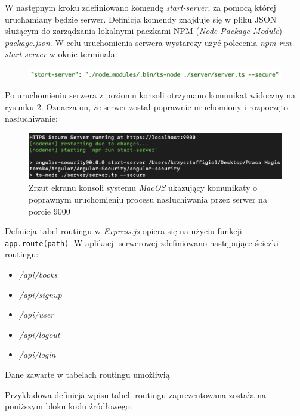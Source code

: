 W następnym kroku zdefiniowano komendę \textit{start-server}, za pomocą której uruchamiany będzie serwer. Definicja komendy znajduje się w pliku JSON służącym do zarządzania lokalnymi paczkami NPM (\textit{Node Package Module}) - \textit{package.json}. W celu uruchomienia serwera wystarczy użyć polecenia \textit{npm run start-server} w oknie terminala. 

\begin{figure}[h]
	\includegraphics[scale=0.7]{images/code/start_server.png}
	\label{Rys:nodejs}
\end{figure}

Po uruchomieniu serwera z poziomu konsoli otrzymano komunikat widoczny na rysunku \ref{Rys:nodejs-running}. Oznacza on, że serwer został poprawnie uruchomiony i rozpoczęto nasłuchiwanie:

\begin{figure}[h]
	\centering\includegraphics[scale=0.76]{images/nodejs/server-running.png}
	\caption{Zrzut ekranu konsoli systemu \textit{MacOS} ukazujący komunikaty o poprawnym uruchomieniu procesu nasłuchiwania przez serwer na porcie 9000}
	\label{Rys:nodejs-running}
\end{figure}

Definicja tabel routingu w \textit{Express.js} opiera się na użyciu funkcji \texttt{app.route(path)}. W aplikacji serwerowej zdefiniowano następujące ścieżki routingu:

\begin{itemize}
	\item \textit{/api/books}
	\item \textit{/api/signup}
	\item \textit{/api/user}
	\item \textit{/api/logout}
	\item \textit{/api/login}
\end{itemize}

Dane zawarte w tabelach routingu umożliwią 

Przykładowa definicja wpisu tabeli routingu zaprezentowana została na poniższym bloku kodu źródłowego:


